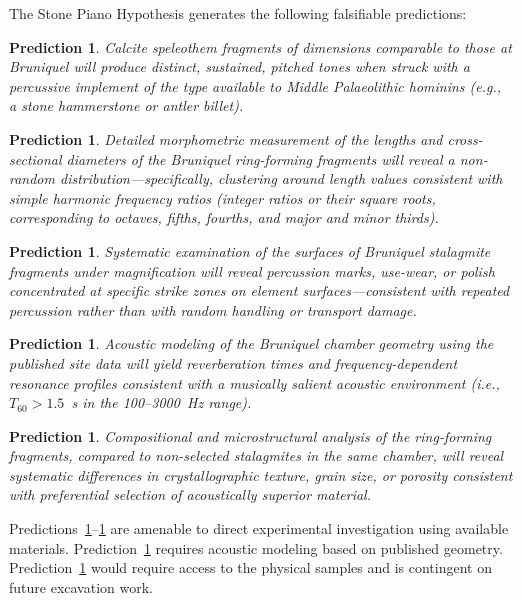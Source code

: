 \documentclass[12pt]{article}
\newtheorem{prediction}[hypothesis]{Prediction}
\begin{document}
The Stone Piano Hypothesis generates the following falsifiable predictions:

\begin{prediction}\label{pred:acoustic}
Calcite speleothem fragments of dimensions comparable to those at Bruniquel will produce distinct, sustained, pitched tones when struck with a percussive implement of the type available to Middle Palaeolithic hominins (e.g., a stone hammerstone or antler billet).
\end{prediction}

\begin{prediction}\label{pred:harmonic}
Detailed morphometric measurement of the lengths and cross-sectional diameters of the Bruniquel ring-forming fragments will reveal a non-random distribution—specifically, clustering around length values consistent with simple harmonic frequency ratios (integer ratios or their square roots, corresponding to octaves, fifths, fourths, and major and minor thirds).
\end{prediction}

\begin{prediction}\label{pred:marks}
Systematic examination of the surfaces of Bruniquel stalagmite fragments under magnification will reveal percussion marks, use-wear, or polish concentrated at specific strike zones on element surfaces—consistent with repeated percussion rather than with random handling or transport damage.
\end{prediction}

\begin{prediction}\label{pred:reverb}
Acoustic modeling of the Bruniquel chamber geometry using the published site data will yield reverberation times and frequency-dependent resonance profiles consistent with a musically salient acoustic environment (i.e., $T_{60} > 1.5$~s in the 100--3000~Hz range).
\end{prediction}

\begin{prediction}\label{pred:selection}
Compositional and microstructural analysis of the ring-forming fragments, compared to non-selected stalagmites in the same chamber, will reveal systematic differences in crystallographic texture, grain size, or porosity consistent with preferential selection of acoustically superior material.
\end{prediction}

Predictions~\ref{pred:acoustic}--\ref{pred:marks} are amenable to direct experimental investigation using available materials. Prediction~\ref{pred:reverb} requires acoustic modeling based on published geometry. Prediction~\ref{pred:selection} would require access to the physical samples and is contingent on future excavation work.
\end{document}
